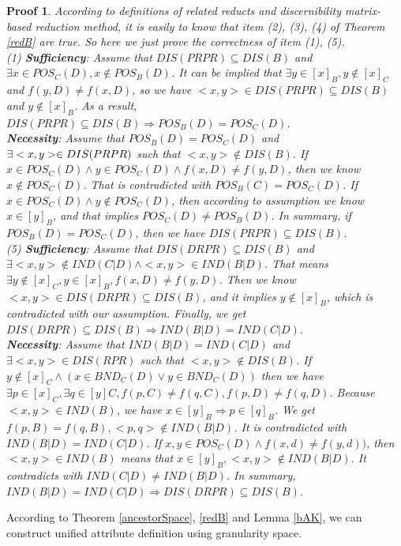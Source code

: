 \documentclass[review]{elsarticle}
\newtheorem*{myPrf}{Proof}
\begin{document}
		\begin{myPrf}
			According to definitions of related reducts and discernibility matrix-based reduction method, it is easily to know that item {\rm(2)}, {\rm(3)}, {\rm(4)} of Theorem \ref{redB} are true. So here we just prove the correctness of item {\rm(1)}, {\rm(5)}. \\
			\rm(1) \textbf{Sufficiency}: Assume that $DIS(PRPR) \subseteq DIS(B)$ and $\exists x \in POS_C(D), x \not \in POS_B(D)$. It can be implied that $\exists y \in [x]_B, y \not \in [x]_C$ and $f(y,D) \neq f(x,D)$, so we have $<x,y> \in DIS(PRPR) \subseteq DIS(B)$ and $y \not \in [x]_B$. As a result, $DIS(PRPR) \subseteq DIS(B) \Rightarrow POS_B(D)=POS_C(D)$.\\
			\textbf{Necessity}: Assume that $POS_B(D)=POS_C(D)$ and $\exists <x,y> \in DIS(PR\\PR)$ such that $<x,y> \not \in DIS(B)$. If $x \in POS_C(D) \wedge y \in POS_C(D) \wedge f(x,D)\neq f(y,D)$, then we know $x \not \in POS_C(D)$. That is contradicted with $POS_B(C)=POS_C(D)$. If $x \in POS_C(D) \wedge y \not \in POS_C(D)$, then according to assumption we know $x \in [y]_B$, and that implies $POS_C(D) \neq POS_B(D)$. In summary, if  $POS_B(D)=POS_C(D)$, then we have $DIS(PRPR) \subseteq DIS(B)$. \\
			{\rm(5)} \textbf{Sufficiency}: Assume that $DIS(DRPR) \subseteq DIS(B)$ and $\exists <x,y> \not \in IND(C|D) \wedge <x,y> \in IND(B|D)$. That means $\exists y \not \in [x]_C, y\in [x]_B,f(x,D) \neq f(y,D)$. Then we know $<x,y> \in DIS(DRPR) \subseteq DIS(B)$, and it implies $y \not \in [x]_B$, which is contradicted with our assumption. Finally, we get $DIS(DRPR) \subseteq DIS(B) \Rightarrow IND(B|D) = IND(C|D)$.\\
			\textbf{Necessity}: Assume that $IND(B|D)=IND(C|D)$ and $\exists <x,y> \in DIS(RPR)$ such that $<x,y> \not \in DIS(B)$. If $y \not \in [x]_C \wedge(x \in BND_C(D) \vee y \in BND_C(D))$ then we have $\exists p\in[x]_C,\exists q\in[y]C, f(p,C) \neq f(q,C), f(p,D) \neq f(q,D)$. Because $<x,y> \in IND(B)$, we have $x\in [y]_B \Rightarrow p \in [q]_B$. We get $f(p,B)=f(q,B),<p,q> \not \in IND(B|D)$. It is contradicted with $IND(B|D)=IND(C|D)$. If $x,y \in POS_C(D) \wedge f(x,d) \neq f(y,d))$, then $<x,y> \in IND(B)$ means that $x \in [y]_B, <x,y>\not \in IND(B|D)$. It contradicts with $IND(C|D) \neq IND(B|D)$. In summary, $IND(B|D) = IND(C|D) \Rightarrow DIS(DRPR) \subseteq DIS(B)$.\\
		\end{myPrf}
		According to Theorem \ref{ancestorSpace}, \ref{redB} and Lemma \ref{bAK}, we can construct unified attribute definition using granularity space.
\end{document}
